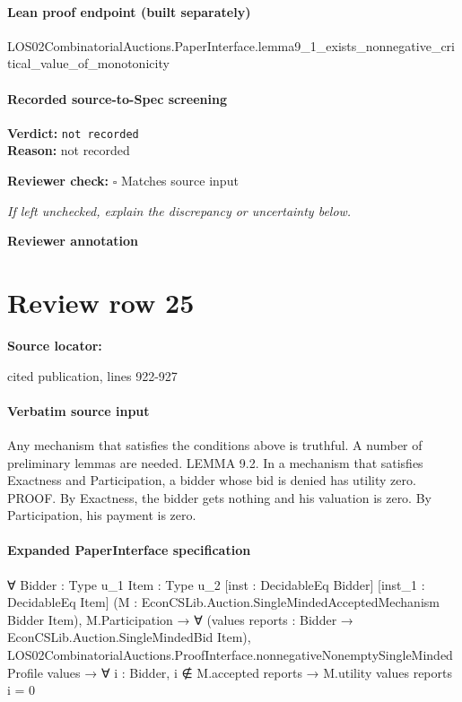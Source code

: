 \documentclass[10pt]{article}
\newcommand{\reviewerbox}{%
  \par\noindent\fbox{\parbox{0.96\linewidth}{\rule{0pt}{0.38in}}}\par
}
\newcommand{\reviewmatch}[1]{%
  \par\noindent\textbf{Reviewer check:} $\square$\; #1\par
  \noindent\emph{If left unchecked, explain the discrepancy or uncertainty below.}\par
}
\begin{document}
\paragraph{Lean proof endpoint (built separately)}\begin{ReviewVerbatim}
LOS02CombinatorialAuctions.PaperInterface.lemma9_1_exists_nonnegative_critical_value_of_monotonicity
\end{ReviewVerbatim}

\paragraph{Recorded source-to-Spec screening}
\textbf{Verdict:} \texttt{not recorded}
\\
\textbf{Reason:} not recorded
\reviewmatch{Matches source input}
\noindent\textbf{Reviewer annotation}\par
\reviewerbox
\clearpage
\hypertarget{source-claim-4ca1501deb404166}{}
\section*{Review row 25}
\textbf{Source locator:} {\footnotesize\raggedright cited publication, lines 922-\allowbreak{}927\par}
\paragraph{Verbatim source input}
\begin{ReviewVerbatim}
Any mechanism that satisfies the conditions above is truthful. A number of
preliminary lemmas are needed.
LEMMA 9.2. In a mechanism that satisfies Exactness and Participation, a
bidder whose bid is denied has utility zero.
PROOF. By Exactness, the bidder gets nothing and his valuation is zero. By
Participation, his payment is zero.
\end{ReviewVerbatim}


\paragraph{Expanded PaperInterface specification}
\begin{ReviewVerbatim}
∀ {Bidder : Type u_1} {Item : Type u_2} [inst : DecidableEq Bidder] [inst_1 : DecidableEq Item]
  (M : EconCSLib.Auction.SingleMindedAcceptedMechanism Bidder Item),
  M.Participation →
    ∀ (values reports : Bidder → EconCSLib.Auction.SingleMindedBid Item),
      LOS02CombinatorialAuctions.ProofInterface.nonnegativeNonemptySingleMindedProfile values →
        ∀ {i : Bidder}, i ∉ M.accepted reports → M.utility values reports i = 0
\end{ReviewVerbatim}
\end{document}

